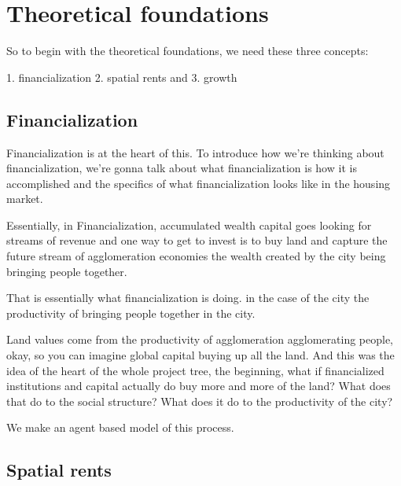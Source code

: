 \documentclass[]{article}
\begin{document}
\section{Theoretical foundations}

So to begin with the theoretical foundations, we need these three concepts: 

1. financialization
2. spatial rents and
3. growth

\subsection{Financialization}



Financialization is at the heart of this. To introduce how we're thinking about financialization, we’re gonna talk about what financialization is %
how it is accomplished
and the specifics of what financialization looks like in the housing market.


Essentially, in Financialization, %
accumulated wealth capital goes looking for streams of revenue and one way to get to invest is to buy land and capture the future stream of agglomeration economies the wealth created by the city being bringing people together.

That is essentially what financialization is doing. %
in the case of the city the productivity of bringing people together in the city. 

Land values come from the productivity of agglomeration agglomerating people, okay, so you can imagine global capital buying up all the land.
And this was the idea of the heart of the whole project tree, the beginning, what if financialized institutions and capital actually do buy more and more of the land? What does that do to the social structure? What does it do to the productivity of the city?

We make an agent based model of this process. 


\subsection{Spatial rents}
\end{document}
